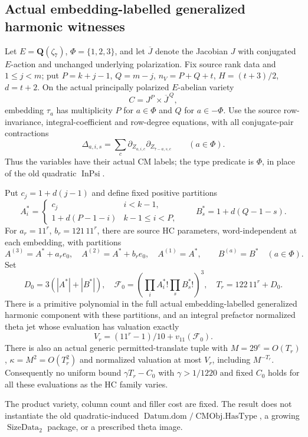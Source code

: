 \subsection{Actual embedding-labelled generalized harmonic witnesses}

\begin{proposition}\label{DP65}
Let $E=\mathbf Q(\zeta_7)$, $\Phi=\{1,2,3\}$, and let
$\overline J$ denote the Jacobian $J$ with conjugated $E$-action and
unchanged underlying polarization. Fix source rank data and $1\le j<m$;
put $P=k+j-1$, $Q=m-j$, $n_V=P+Q+t$, $H=(t+3)/2$, $d=t+2$.
On the actual principally polarized $E$-abelian variety
\[
 C=J^P\times\overline J^{\,Q},
\]
embedding $\tau_a$ has multiplicity $P$ for $a\in\Phi$ and $Q$ for
$a\in-\Phi$. Use the source row-invariance, integral-coefficient and
row-degree equations, with all conjugate-pair contractions
\[
 \Delta_{a,i,s}=\sum_c
 \partial_{Z_{a,i,c}}\partial_{Z_{7-a,s,c}}\qquad(a\in\Phi).
\]
Thus the variables have their actual CM labels; the type predicate is
$\Phi$, in place of the old quadratic $\operatorname{InPsi}$.

Put $c_j=1+d(j-1)$ and define fixed positive partitions
\[
 A_i^*=\begin{cases}c_j&i<k-1,\\1+d(P-1-i)&k-1\le i<P,\end{cases}
 \qquad B_s^*=1+d(Q-1-s).
\]
For $a_r=11^r$, $b_r=121\,11^r$, there are source HC parameters,
word-independent at each embedding, with partitions
\[
 A^{(3)}=A^*+a_re_0,\quad A^{(2)}=A^*+b_re_0,\quad
 A^{(1)}=A^*,\qquad B^{(a)}=B^*\quad(a\in\Phi).
\]
Set
\[
 D_0=3(|A^*|+|B^*|),\quad
 \mathcal F_0=\left(\prod_iA_i^*!\prod_sB_s^*!\right)^3,
 \quad T_r=122\,11^r+D_0.
\]
There is a primitive polynomial in the full actual embedding-labelled
generalized harmonic component with these partitions, and an integral
prefactor normalized theta jet whose evaluation has valuation exactly
\[
 V_r=(11^r-1)/10+v_{11}(\mathcal F_0).
\]
There is also an actual generic permitted-translate tuple with
$M=29^e=O(T_r)$, $\kappa=M^2=O(T_r^2)$ and normalized valuation at most
$V_r$, including $M^{-T_r}$. Consequently no uniform bound
$\gamma T_r-C_0$ with $\gamma>1/1220$ and fixed $C_0$ holds for all
these evaluations as the HC family varies.

The product variety, column count and filler cost are fixed. The result
does not instantiate the old quadratic-induced
$\operatorname{Datum.dom}/\operatorname{CMObj.HasType}$, a growing
$\operatorname{SizeData}_2$ package, or a prescribed theta image.
\end{proposition}

